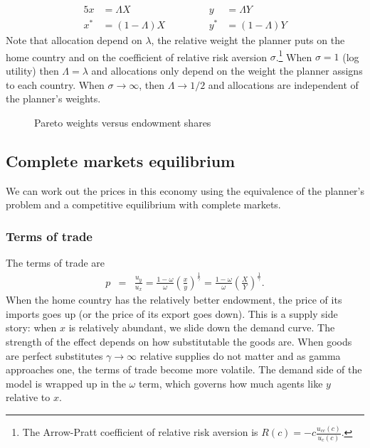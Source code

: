 \documentclass[11pt,pdftex,twoside,letterpaper]{exam}
\begin{document}
\begin{alignat}{5}
   x  &= \Lambda X &\qquad&&y &= \Lambda Y \\
   x^*&= (1-\Lambda)X   &\qquad&&y^* &= (1-\Lambda)Y
 \end{alignat}
 Note that allocation depend on $\lambda$, the relative weight the planner puts on the home country and on the coefficient of relative risk aversion $\sigma$.\footnote{The Arrow-Pratt coefficient of relative risk aversion is $R(c)=-c\frac{u_{cc}(c)}{u_c(c)}$.} When $\sigma=1$ (log utility) then $\Lambda=\lambda$ and allocations only depend on the weight the planner assigns to each country. When $\sigma \rightarrow \infty$, then $\Lambda \rightarrow 1/2$ and allocations are independent of the planner's weights.

 \begin{figure}[H]
 \centering
 \caption{Pareto weights versus endowment shares}
    \end{figure}

 \subsection{Complete markets equilibrium}
 We can work out the prices in this economy using the equivalence of the planner's problem and a competitive equilibrium with complete markets.
 \subsubsection{Terms of trade}
 The terms of trade are
 \begin{eqnarray}
   p &=& \frac{u_y}{u_x} = \frac{1-\omega}{\omega}\left(\frac{x}{y}\right)^\frac{1}{\gamma}=\frac{1-\omega}{\omega}\left(\frac{X}{Y}\right)^\frac{1}{\gamma} \label{eq:tot}.
 \end{eqnarray}
 When the home country has the relatively better endowment, the price of its imports goes up (or the price of its export goes down). This is a supply side story: when $x$ is relatively abundant, we slide down the demand curve. The strength of the effect depends on how substitutable the goods are. When goods are perfect substitutes $\gamma \rightarrow \infty$ relative supplies do not matter and as gamma approaches one, the terms of trade become more volatile. The demand side of the model is wrapped up in the $\omega$ term, which governs how much agents like $y$ relative to $x$.
\end{document}
